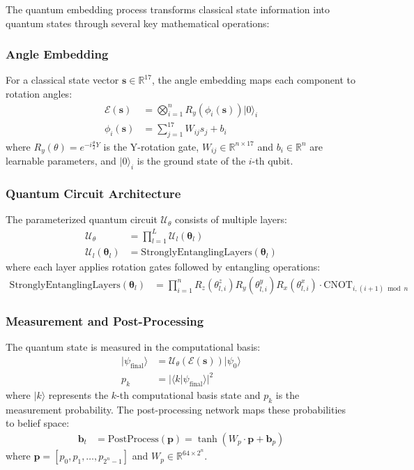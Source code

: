 \documentclass[11pt]{article}
\begin{document}
The quantum embedding process transforms classical state information into quantum states through several key mathematical operations:

\subsubsection{Angle Embedding}
For a classical state vector $\mathbf{s} \in \mathbb{R}^{17}$, the angle embedding maps each component to rotation angles:
\begin{align}
    \mathcal{E}(\mathbf{s}) &= \bigotimes_{i=1}^{n} R_y(\phi_i(\mathbf{s}))|0\rangle_i \\
    \phi_i(\mathbf{s}) &= \sum_{j=1}^{17} W_{ij} s_j + b_i
\end{align}
where $R_y(\theta) = e^{-i\frac{\theta}{2}Y}$ is the Y-rotation gate, $W_{ij} \in \mathbb{R}^{n \times 17}$ and $b_i \in \mathbb{R}^n$ are learnable parameters, and $|0\rangle_i$ is the ground state of the $i$-th qubit.

\subsubsection{Quantum Circuit Architecture}
The parameterized quantum circuit $\mathcal{U}_{\theta}$ consists of multiple layers:
\begin{align}
    \mathcal{U}_{\theta} &= \prod_{l=1}^{L} \mathcal{U}_l(\boldsymbol{\theta}_l) \\
    \mathcal{U}_l(\boldsymbol{\theta}_l) &= \text{StronglyEntanglingLayers}(\boldsymbol{\theta}_l)
\end{align}
where each layer applies rotation gates followed by entangling operations:
\begin{align}
    \text{StronglyEntanglingLayers}(\boldsymbol{\theta}_l) &= \prod_{i=1}^{n} R_z(\theta_{l,i}^z) R_y(\theta_{l,i}^y) R_x(\theta_{l,i}^x) \cdot \text{CNOT}_{i,(i+1)\bmod n}
\end{align}

\subsubsection{Measurement and Post-Processing}
The quantum state is measured in the computational basis:
\begin{align}
    |\psi_{\text{final}}\rangle &= \mathcal{U}_{\theta}(\mathcal{E}(\mathbf{s}))|\psi_0\rangle \\
    p_k &= |\langle k | \psi_{\text{final}} \rangle|^2
\end{align}
where $|k\rangle$ represents the $k$-th computational basis state and $p_k$ is the measurement probability. The post-processing network maps these probabilities to belief space:
\begin{align}
    \mathbf{b}_t &= \text{PostProcess}(\mathbf{p}) = \tanh(W_p \cdot \mathbf{p} + \mathbf{b}_p)
\end{align}
where $\mathbf{p} = [p_0, p_1, \ldots, p_{2^n-1}]$ and $W_p \in \mathbb{R}^{64 \times 2^n}$.
\end{document}
